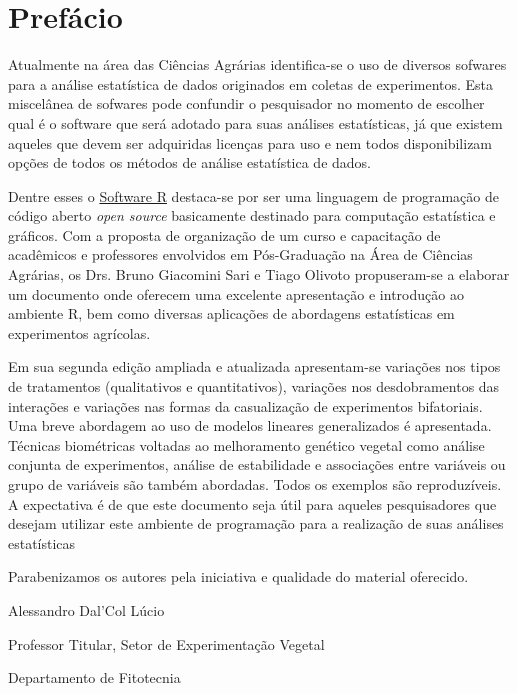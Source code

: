 \documentclass[
]{book}
\numberwithin{equation}{section}
\begin{document}
\setlength{\parindent}{3em}


{
\setcounter{tocdepth}{3}
\tableofcontents
}
\hypertarget{prefuxe1cio}{%
\chapter*{Prefácio}\label{prefuxe1cio}}

Atualmente na área das Ciências Agrárias identifica-se o uso de diversos sofwares para a análise estatística de dados originados em coletas de experimentos. Esta miscelânea de sofwares pode confundir o pesquisador no momento de escolher qual é o software que será adotado para suas análises estatísticas, já que existem aqueles que devem ser adquiridas licenças para uso e nem todos disponibilizam opções de todos os métodos de análise estatística de dados.

Dentre esses o \href{https://www.r-project.org/}{Software R} destaca-se por ser uma linguagem de programação de código aberto \emph{open source} basicamente destinado para computação estatística e gráficos. Com a proposta de organização de um curso e capacitação de acadêmicos e professores envolvidos em Pós-Graduação na Área de Ciências Agrárias, os Drs. Bruno Giacomini Sari e Tiago Olivoto propuseram-se a elaborar um documento onde oferecem uma excelente apresentação e introdução ao ambiente R, bem como diversas aplicações de abordagens estatísticas em experimentos agrícolas.

Em sua segunda edição ampliada e atualizada apresentam-se variações nos tipos de tratamentos (qualitativos e quantitativos), variações nos desdobramentos das interações e variações nas formas da casualização de experimentos bifatoriais. Uma breve abordagem ao uso de modelos lineares generalizados é apresentada. Técnicas biométricas voltadas ao melhoramento genético vegetal como análise conjunta de experimentos, análise de estabilidade e associações entre variáveis ou grupo de variáveis são também abordadas. Todos os exemplos são reproduzíveis. A expectativa é de que este documento seja útil para aqueles pesquisadores que desejam utilizar este ambiente de programação para a realização de suas análises estatísticas

Parabenizamos os autores pela iniciativa e qualidade do material oferecido.

Alessandro Dal'Col Lúcio

Professor Titular, Setor de Experimentação Vegetal

Departamento de Fitotecnia
\end{document}
